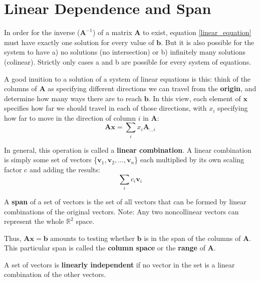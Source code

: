 \documentclass[11pt,twocolumn]{report}
\def\realnumbers{\mathbb{R}}
\begin{document}
\section{Linear Dependence and Span}

In order for the inverse ($\bm{A}^{-1}$) of a matrix $\bm{A}$ to exist, equation
\ref{linear_equation} must have exactly one solution for every value of
$\bm{b}$. But it is also possible for the system to have a) no solutions (no
intersection) or b) infinitely many solutions (colinear). Strictly only cases a
and b are possible for every system of equations.

A good inuition to a solution of a system of linear equations is this: think of
the columns of $\bm{A}$ as specifying different directions we can travel from
the \textbf{origin}, and determine how many ways there are to reach $\bm{b}$.
In this view, each element of $\bm{x}$ specifies how far we should travel in
each of those directions, with $x_i$ specifying how far to move in the
direction of column $i$ in $\bm{A}$:
\begin{equation}
  \bm{Ax} = \sum_i x_i\bm{A}_{:, i}
\end{equation}

In general, this operation is called a \textbf{linear combination}. A linear
combination is simply some set of vectors \{$\bm{v}_1, \bm{v}_2, ..., \bm{v}_n$\}
each multiplied by its own scaling factor c and adding the results:
\begin{equation}
  \sum_i c_i\bm{v}_i
\end{equation}

A \textbf{span} of a set of vectors is the set of all vectors that can be
formed by linear combinations of the original vectors. 
Note: Any two noncollinear vectors can represent the whole $\realnumbers^2$
space.

Thus, $\bm{Ax} = \bm{b}$ amounts to testing whether $\bm{b}$ is in the span of
the columns of $\bm{A}$. This particular span is called the \textbf{column
  space} or the \textbf{range} of $\bm{A}$.

A set of vectors is \textbf{linearly independent} if no vector in the set is a
linear combination of the other vectors.
\end{document}
